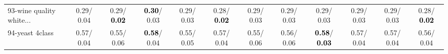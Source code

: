 \begin{table}[h]
\begin{center}
{\begin{tabular}{lc|c|c|c|c|c|c|c|c|c|c}
93-wine quality white... &   0.29/  0.04 &   0.29/\textcolor{black}{\textbf{  0.02}} & \textcolor{black}{\textbf{  0.30}}/  0.03 &   0.29/  0.03 &   0.28/\textcolor{black}{\textbf{  0.02}} &   0.29/  0.03 &   0.29/  0.03 &   0.29/  0.03 &   0.29/  0.03 &   0.29/  0.03 &   0.28/\textcolor{black}{\textbf{  0.02}} \\
94-yeast 4class &   0.57/  0.04 &   0.55/  0.06 & \textcolor{black}{\textbf{  0.58}}/  0.04 &   0.55/  0.05 &   0.57/  0.04 &   0.55/  0.06 &   0.56/  0.06 & \textcolor{black}{\textbf{  0.58}}/\textcolor{black}{\textbf{  0.03}} &   0.57/  0.04 &   0.57/  0.04 &   0.56/  0.04 \\\end{tabular}}\label{stratsBalAcc2bC4.5}
\end{center}
\end{table}